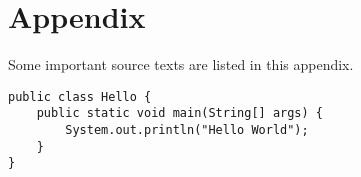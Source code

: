 \chapter{Appendix}
Some important source texts are listed in this appendix.

\begin{lstlisting}
public class Hello {
    public static void main(String[] args) {
        System.out.println("Hello World");
    }
}
\end{lstlisting}


